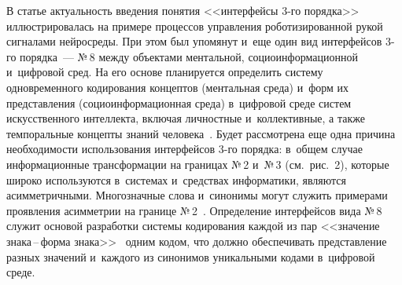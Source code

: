 \begin{multicols}{2}
  В статье актуальность введения понятия <<интерфейсы 3-го порядка>> 
иллюстрировалась на примере процессов управления роботизированной рукой 
сигналами нейросреды. При этом был упомянут и~еще один вид интерфейсов  
3-го порядка~--- №\,8 между объектами ментальной,  
со\-цио\-ин\-фор\-ма\-ци\-он\-ной и~цифровой сред. На его основе планируется 
определить сис\-те\-му одновременного кодирования концептов (ментальная 
среда) и~форм их пред\-став\-ле\-ния (со\-цио\-ин\-фор\-ма\-ци\-он\-ная среда) 
в~циф\-ро\-вой среде сис\-тем искусственного интеллекта, вклю\-чая личностные 
и~коллективные, а также темпоральные концепты знаний  
человека~\cite{16-zat, 17-zat}. Будет рас\-смот\-ре\-на еще одна причина 
необходимости использования интерфейсов 3-го порядка: в~общем случае 
информационные трансформации на границах №\,2 и~№\,3 (см.\ рис.~2), которые 
широко используются в~сис\-те\-мах и~средствах информатики, являются\linebreak 
асим\-мет\-рич\-ны\-ми. Многозначные слова и~синони\-мы могут служить примерами 
проявления асиммет\-рии на границе №\,2~\cite{24-zat}. Определение 
интерфейсов вида №\,8 служит основой разработки сис\-те\-мы кодирования каж\-дой 
из пар <<значение зна\-ка\,--\,фор\-ма знака>>~\cite{19-zat} одним кодом, что 
должно обеспечивать пред\-став\-ле\-ние разных значений и~каждого из синонимов 
уникальными кодами в~циф\-ро\-вой среде.

\vspace*{-6pt}
  
{\small\frenchspacing
 {%
 \begin{thebibliography}{99}
 
 \vspace*{-3pt}
 

\end{thebibliography}}}
\end{multicols}
